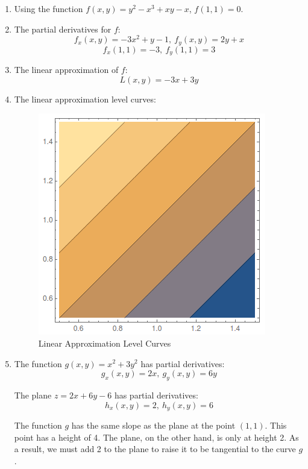 \documentclass{article}
\begin{document}
\begin{enumerate}[1.]
  \item Using the function $f(x, y) = y^{2} - x^{3} + xy - x$, $f(1, 1) = 0$.

  \item The partial derivatives for $f$:
    $$ f_{x}(x, y) = -3x^{2} + y - 1, \ f_{y}(x, y) = 2y + x $$
    $$ f_{x}(1, 1) = -3, \ f_{y}(1, 1) = 3 $$

  \item The linear approximation of $f$:
    $$ L(x, y) = -3x + 3y $$

  \item The linear approximation level curves:

    \begin{figure}[H]
      \centering
      \includegraphics[scale=0.60]{"LinearApproximationLevelCurves"}
      \caption{Linear Approximation Level Curves}
    \end{figure}

  \item The function $g(x, y) = x^{2} + 3y^{2}$ has partial derivatives:
    $$ g_{x}(x, y) = 2x, \ g_{y}(x, y) = 6y $$

    The plane $z = 2x + 6y - 6$ has partial derivatives:
    $$ h_{x}(x, y) = 2, \ h_{y}(x, y) = 6 $$

    The function $g$ has the same slope as the plane at the point $(1,1)$. This
    point has a height of 4. The plane, on the other hand, is only at height 2.
    As a result, we must add 2 to the plane to raise it to be tangential to the
    curve $g$.

    \bigbreak


\end{enumerate}
\end{document}

